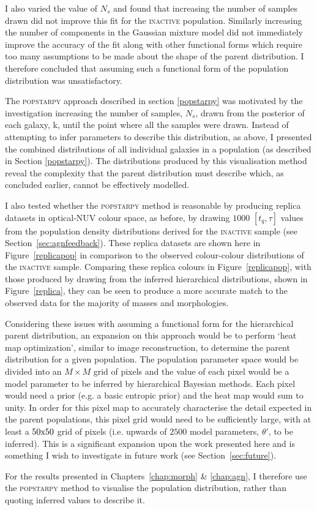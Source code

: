 I also varied the value of $N_s$ and found that increasing the number of samples drawn did not improve this fit for the \textsc{inactive} population. Similarly increasing the number of components in the Gaussian mixture model did not immediately improve the accuracy of the fit along with other functional forms which require too many assumptions to be made about the shape of the parent distribution. I therefore concluded that assuming such a functional form of the population distribution was unsatisfactory. %

The \textsc{popstarpy} approach described in section \ref{popstarpy} was motivated by the investigation increasing the number of samples, $N_s$, drawn from the posterior of each galaxy, k, until the point where all the samples were drawn. Instead of attempting to infer parameters to describe this distribution, as above, I presented the combined distributions of all individual galaxies in a population (as described in Section \ref{popstarpy}).  The distributions produced by this visualisation method reveal the complexity that the parent distribution must describe which, as concluded earlier, cannot be effectively modelled.

I also tested whether the \textsc{popstarpy} method is reasonable by producing replica datasets in optical-NUV colour space, as before, by drawing $1000$ $[t_q, \tau]$ values from the population density distributions derived for the \textsc{inactive} sample (see Section~\ref{sec:agnfeedback}). These replica datasets are shown here in Figure~\ref{replicapop} in comparison to the observed colour-colour distributions of the \textsc{inactive} sample. Comparing these replica colours in Figure~\ref{replicapop}, with those produced by drawing from the inferred hierarchical distributions, shown in Figure~\ref{replica}, they can be seen to produce a more accurate match to the observed data for the majority of masses and morphologies. 

Considering these issues with assuming a functional form for the hierarchical parent distribution, an expansion on this approach would be to perform `heat map optimization', similar to image reconstruction, to determine the parent distribution for a given population. The population parameter space would be divided into an $M \times M$ grid of pixels and the value of each pixel would be a model parameter to be inferred by hierarchical Bayesian methods. Each pixel would need a prior (e.g. a basic entropic prior) and the heat map would sum to unity. In order for this pixel map to accurately characterise the detail expected in the parent populations, this pixel grid would need to be sufficiently large, with at least a $50\rm{x}50$ grid of pixels (i.e. upwards of $2500$ model parameters, $\theta'$, to be inferred). This is a significant expansion upon the work presented here and is something I wish to investigate in future work (see Section~\ref{sec:future}).

For the results presented in Chapters~\ref{chap:morph} \& \ref{chap:agn}, I therefore use the \textsc{popstarpy} method to visualise the population distribution, rather than quoting inferred values to describe it.


